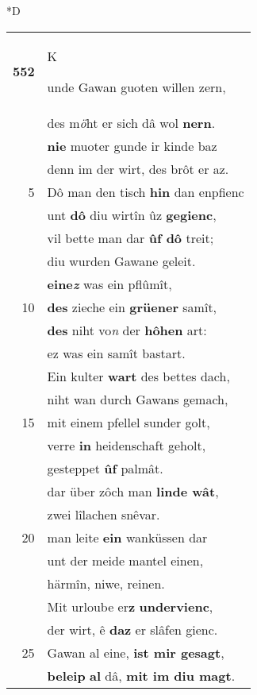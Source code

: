 \documentclass[8pt,a4paper,notitlepage]{article}
\begin{document}
\begin{table}[ht]
\begin{minipage}[t]{0.5\linewidth}
\small
\begin{center}*D
\end{center}
\begin{tabular}{rl}
\textbf{552} & \begin{large}K\end{large}unde Gawan guoten willen zern,\\ 
 & des m\textit{ö}ht er sich dâ wol \textbf{nern}.\\ 
 & \textbf{nie} muoter gunde ir kinde baz\\ 
 & denn im der wirt, des brôt er az.\\ 
5 & Dô man den tisch \textbf{hin} dan enpfienc\\ 
 & unt \textbf{dô} diu wirtîn ûz \textbf{gegienc},\\ 
 & vil bette man dar \textbf{ûf dô} treit;\\ 
 & diu wurden Gawane geleit.\\ 
 & \textbf{eine\textit{z}} was ein pflûmît,\\ 
10 & \textbf{des} zieche ein \textbf{grüener} samît,\\ 
 & \textbf{des} niht vo\textit{n} der \textbf{hôhen} art:\\ 
 & ez was ein samît bastart.\\ 
 & Ein kulter \textbf{wart} des bettes dach,\\ 
 & niht wan durch Gawans gemach,\\ 
15 & mit einem pfellel sunder golt,\\ 
 & verre \textbf{in} heidenschaft geholt,\\ 
 & gesteppet \textbf{ûf} palmât.\\ 
 & dar über zôch man \textbf{linde wât},\\ 
 & zwei lîlachen snêvar.\\ 
20 & man leite \textbf{ein} wanküssen dar\\ 
 & unt der meide mantel einen,\\ 
 & härmîn, niwe, reinen.\\ 
 & Mit urloube er\textbf{z} \textbf{undervienc},\\ 
 & der wirt, ê \textbf{daz} er slâfen gienc.\\ 
25 & Gawan al eine, \textbf{ist mir gesagt},\\ 
 & \textbf{beleip} \textbf{al} dâ, \textbf{mit im diu magt}.\\ 

\end{tabular}
\end{minipage}
\end{table}
\end{document}
